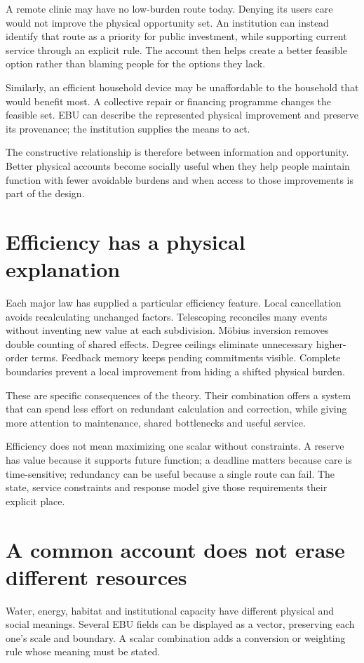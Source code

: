 A remote clinic may have no low-burden route today. Denying its users care would not improve the physical opportunity set. An institution can instead identify that route as a priority for public investment, while supporting current service through an explicit rule. The account then helps create a better feasible option rather than blaming people for the options they lack.

Similarly, an efficient household device may be unaffordable to the household that would benefit most. A collective repair or financing programme changes the feasible set. EBU can describe the represented physical improvement and preserve its provenance; the institution supplies the means to act.

The constructive relationship is therefore between information and opportunity. Better physical accounts become socially useful when they help people maintain function with fewer avoidable burdens and when access to those improvements is part of the design.

\section{Efficiency has a physical explanation}
Each major law has supplied a particular efficiency feature. Local cancellation avoids recalculating unchanged factors. Telescoping reconciles many events without inventing new value at each subdivision. Möbius inversion removes double counting of shared effects. Degree ceilings eliminate unnecessary higher-order terms. Feedback memory keeps pending commitments visible. Complete boundaries prevent a local improvement from hiding a shifted physical burden.

These are specific consequences of the theory. Their combination offers a system that can spend less effort on redundant calculation and correction, while giving more attention to maintenance, shared bottlenecks and useful service.

Efficiency does not mean maximizing one scalar without constraints. A reserve has value because it supports future function; a deadline matters because care is time-sensitive; redundancy can be useful because a single route can fail. The state, service constraints and response model give those requirements their explicit place.

\section{A common account does not erase different resources}
Water, energy, habitat and institutional capacity have different physical and social meanings. Several EBU fields can be displayed as a vector, preserving each one's scale and boundary. A scalar combination adds a conversion or weighting rule whose meaning must be stated.

